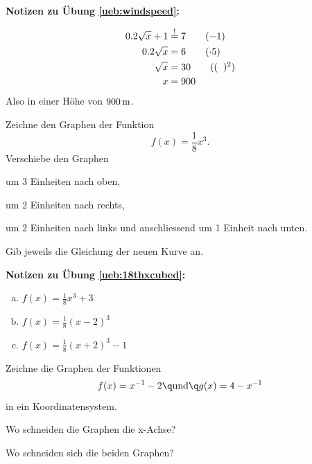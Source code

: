 \documentclass[%
11pt,%
twoside,%
titlepage,%
german,%
headsepline%
]{scrartcl}
\newcommand{\concatueb}[1]{ueb:#1}%
\newcommand{\concatlsg}[1]{lsg:#1}%
\newenvironment{lsg}[1]{%
    \par\noindent\textbf{Notizen zu Übung \ref{\concatueb{#1}}:}%
    \label{\concatlsg{#1}}\par
}{%
    \par%
}
\begin{document}
\begin{lsg}{windspeed}
  \begin{align}
    0.2\sqrt{x}+1 &\stackrel{!}{=} 7\tag{$-1$}\\
    0.2\sqrt{x} &= 6\tag{$\cdot5$}\\
    \sqrt{x} &= 30\tag{$(\phantom{x})^2$}\\
    x &= 900
  \end{align}
  Also in einer Höhe von $\unit[900]{m}$.
\end{lsg}

\begin{ueb}[Verschieben]
Zeichne den Graphen der Funktion
$$f(x)=\frac{1}{8}x^3.$$
Verschiebe den Graphen
\begin{enumeratea}
\item um 3 Einheiten nach oben,
\item um 2 Einheiten nach rechts,
\item um 2 Einheiten nach links und anschliessend um
1 Einheit nach unten.
\end{enumeratea}
Gib jeweils die Gleichung der neuen Kurve an.
\end{ueb}

\begin{lsg}{18thxcubed}
  \begin{enumerate}[a)]
    \item $f(x)=\frac{1}{8}x^3+3$
    \item $f(x)=\frac{1}{8}(x-2)^3$
    \item $f(x)=\frac{1}{8}(x+2)^3-1$
  \end{enumerate}
\end{lsg}

\begin{ueb}[Schnittpunkte]
Zeichne die Graphen der Funktionen
$$f(x)=x^{-1}-2\q\text{und}\q g(x)=4-x^{-1}$$
in ein Koordinatensystem.
\begin{enumeratea}
\item Wo schneiden die Graphen die x-Achse?
\item Wo schneiden sich die beiden Graphen?
\end{enumeratea}
\end{ueb}
\end{document}
